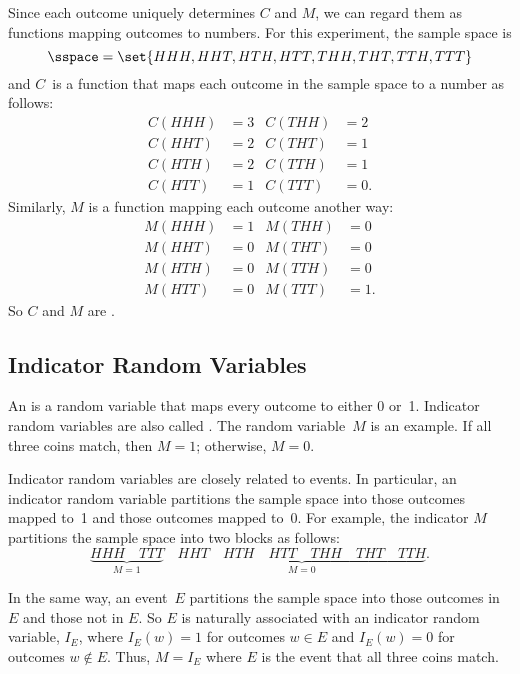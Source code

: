 Since each outcome uniquely determines $C$ and $M$, we can regard them
as functions mapping outcomes to numbers.  For this experiment, the
sample space is
\begin{equation*}
    \sspace = \set{ HHH, HHT, HTH, HTT, THH, THT, TTH, TTT }
\end{equation*}
and $C$~is a function that maps each outcome in the sample space to a
number as follows:
\begin{align*}
C(HHH) & = 3 &  C(THH) & =  2 \\
C(HHT) & = 2 &  C(THT) & =  1 \\
C(HTH) & = 2 &  C(TTH) & =  1 \\
C(HTT) & = 1 &  C(TTT) & =  0.
\end{align*}
Similarly, $M$ is a function mapping each outcome another way:
\begin{align*}
M(HHH) & = 1 & M(THH) & =  0 \\
M(HHT) & = 0 & M(THT) & =  0 \\
M(HTH) & = 0 & M(TTH) & =  0 \\
M(HTT) & = 0 & M(TTT) & =  1.
\end{align*}
So $C$ and $M$ are .

\subsection{Indicator Random Variables}

An  is a random variable that maps
every outcome to either 0 or~1.  Indicator random variables are also
called .  The random variable~$M$ is an
example.  If all three coins match, then $M=1$; otherwise, $M = 0$.

Indicator random variables are closely related to events.  In
particular, an indicator random variable partitions the sample space
into those outcomes mapped to~1 and those outcomes mapped to~0.  For
example, the indicator $M$ partitions the sample space into two blocks
as follows:
\[
\underbrace{HHH \quad TTT}_{\text{$M = 1$}} \quad
\underbrace{HHT \quad HTH \quad HTT \quad
        THH \quad THT \quad TTH}_{\text{$M = 0$}}.
\]

In the same way, an event~$E$ partitions the sample space into those
outcomes in $E$ and those not in $E$.  So $E$ is naturally associated with
an indicator random variable, 
$I_E$, where $I_E(w) = 1$ for outcomes $w \in E$ and $I_E(w) = 0$ for
outcomes $w \notin E$.  Thus, $M=I_E$ where $E$ is the event that all
three coins match.

